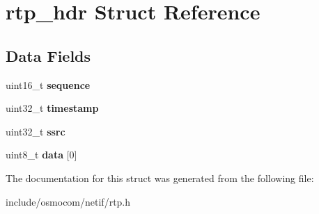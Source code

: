 \section{rtp\+\_\+hdr Struct Reference}
\label{structrtp__hdr}
\subsection*{Data Fields}
\begin{DoxyCompactItemize}
\item 
uint16\+\_\+t {\bfseries sequence}\label{structrtp__hdr_aa885f80060c8688c9a1af01f53e38a8f}

\item 
uint32\+\_\+t {\bfseries timestamp}\label{structrtp__hdr_a542f3a11a8b84ec226b372881094fb60}

\item 
uint32\+\_\+t {\bfseries ssrc}\label{structrtp__hdr_a22e56432758066b9e7cd567189937789}

\item 
uint8\+\_\+t {\bfseries data} [0]\label{structrtp__hdr_abb3702967741d0bf8cad58a0fc6b0c2d}

\end{DoxyCompactItemize}


The documentation for this struct was generated from the following file\+:\begin{DoxyCompactItemize}
\item 
include/osmocom/netif/rtp.\+h\end{DoxyCompactItemize}
